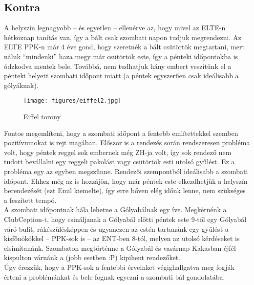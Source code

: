 \subsection{Kontra}
\hspace{2mm} A helyszín legnagyobb -- és egyetlen -- ellenérve az, hogy mivel az ELTE-n hétköznap tanítás van, így a bált csak szombati napon tudjuk megrendezni. Az ELTE PPK-n már 4 éve gond, hogy szeretnék a bált csütörtök megtartani, mert náluk “mindenki” haza megy már csütörtök este, így a pénteki időpontokba is ódzkodva mentek bele. Továbbá, nem tudhatjuk hány embert veszítünk el a pénteki helyett szombati időpont miatt (a péntek egyszerűen csak ideálisabb a gólyáknak). \\
\begin{wrapfigure}[12]{r}{0.2\textwidth} 
\begin{center}
\texttt{[image: figures/eiffel2.jpg]}
\end{center}
\caption{Eiffel torony} 
\label{fig:Eiffel}
\end{wrapfigure}
\indent Fontos megemlíteni, hogy a szombati időpont a fentebb említettekkel szemben pozitívumokat is rejt magában. Először is a rendezés során rendszeresen probléma volt, hogy péntek reggel sok embernek még ZH-ja volt, így sok rendező nem tudott bevállalni egy reggeli pakolást vagy csütörtök esti utolsó gyűlést. Ez a probléma egy az egyben megszűnne. Rendezői szempontból ideálisabb a szombati időpont. Ehhez még az is hozzájön, hogy már péntek este elkezdhetjük a helyszín berendezését (ezt Emil kiemelte), így erre bőven elég időnk lenne, nem szükséges a feszített tempó. \\
\indent A szombati időpontnak hála lehetne a Gólyabálnak egy íve. Megkérnénk a ClubCeption-t, hogy csináljanak a Gólyabál előtti péntek este 9-től egy Gólyabál váró bulit, rákészülésképpen és ugyanezen az estén tartanánk egy gyűlést a kisfőnökökkel -- PPK-sok is -- az ENT-ben 8-tól, melyen az utolsó kérdéseket is elsimítanánk. Szombaton megtörténne a Gólyabál és vasárnap Kakasban éjfél kispulton várnánk a (jobb esetben :P) kipihent rendezőket. \\
\indent Úgy érezzük, hogy a PPK-sok a fentebbi érveinket végighallgatva meg fogják érteni a problémánkat és bele fognak egyezni a szombati bál gondolatába.



